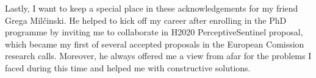 Lastly, I want to keep a special place in these acknowledgements for my friend Grega Milčinski.
He helped to kick off my career after enrolling in the PhD programme by inviting me to collaborate in H2020 PerceptiveSentinel proposal, which became my first of several accepted proposals in the European Comission research calls.
Moreover, he always offered me a view from afar for the problems I faced during this time and helped me with constructive solutions.

